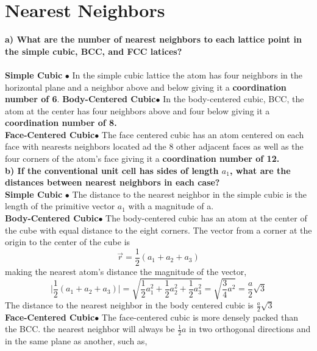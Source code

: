 \documentclass[paper=a4, fontsize=11pt]{scrartcl} %
\numberwithin{equation}{section} %
\numberwithin{figure}{section} %
\numberwithin{table}{section} %
\begin{document}
\section{Nearest Neighbors}
\textbf{a) What are the number of nearest neighbors to each lattice point in the simple cubic, BCC, and FCC latices?}
\\
\\
\textbf{Simple Cubic }$\bullet$ In the simple cubic lattice the atom has four neighbors in the horizontal plane and a neighbor above and below giving it a \textbf{coordination number of 6}.
\newline
\textbf{Body-Centered Cubic}$\bullet$ In the body-centered cubic, BCC, the atom at the center has four  neighbors above and four below giving it a \textbf{coordination number of 8.}\\
\textbf{Face-Centered Cubic}$\bullet$  The face centered cubic has an atom centered on each face with nearests neighbors located ad the 8 other adjacent faces as well as the four corners of the atom's face giving it a \textbf{coordination number of 12.}
\newline \\
\textbf{b)  If the conventional unit cell has sides of length $a_1$, what are the distances between nearest neighbors in each case?}
\\
\textbf{Simple Cubic }$\bullet$  The distance to the nearest neighbor in the simple cubic is the length of the primitive vector $a_1$ with a magnitude of a.\\
\textbf{Body-Centered Cubic}$\bullet$  The body-centered cubic has an atom at the center of the cube with equal distance to the eight corners. The vector from a corner at the origin to the center of the cube is $$\vec{r} = \frac{1}{2} (a_1+a_2+a_3)$$  making the nearest atom's distance the magnitude of the vector,
\begin{equation*}
\bigg|\frac{1}{2} (a_1+a_2+a_3)\bigg| = \sqrt{\frac{1}{2}a_1^2+\frac{1}{2}a_2^2+\frac{1}{2}a_3^2 } = \sqrt{\frac{3}{4}a^2} = \frac{a}{2}\sqrt{3}
\end{equation*}
The distance to the nearest neighbor in the body centered cubic is $\frac{a}{2}\sqrt{3}$ \\

\textbf{Face-Centered Cubic}$\bullet$  The face-centered cubic is more densely packed than the BCC. the nearest neighbor will always be $\frac{1}{2}a$ in two orthogonal directions and in the same plane as another, such as,
\end{document}
